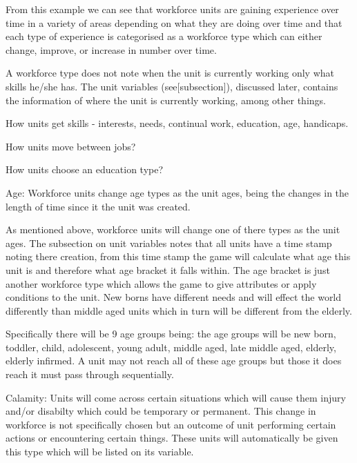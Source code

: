 From this example we can see that workforce units are gaining experience over time in a variety of areas depending on what they are doing over time and that each type of experience is categorised as a workforce type which can either change, improve, or increase in number over time. 

A workforce type does not note when the unit is currently working only what skills he/she has. The unit variables (see[subsection]), discussed later, contains the information of where the unit is currently working, among other things.

How units get skills - interests, needs, continual work, education, age, handicaps.

How units move between jobs?

How units choose an education type?



Age:
Workforce units change age types as the unit ages, being the changes in the length of time since it the unit was created. 

As mentioned above, workforce units will change one of there types as the unit ages. The subsection on unit variables notes that all units have a time stamp noting there creation, from this time stamp the game will calculate what age this unit is and therefore what age bracket it falls within. The age bracket is just another workforce type which allows the game to give attributes or apply conditions to the unit. New borns have different needs and will effect the world differently than middle aged units which in turn will be different from the elderly. 

Specifically there will be 9 age groups being: the age groups will be new born, toddler, child, adolescent, young adult, middle aged, late middle aged, elderly, elderly infirmed. A unit may not reach all of these age groups but those it does reach it must pass through sequentially.


Calamity:
Units will come across certain situations which will cause them injury and/or disabilty which could be temporary or permanent. This change in workforce is not specifically chosen but an outcome of unit performing certain actions or encountering certain things. These units will automatically be given this type which will be listed on its variable.  



